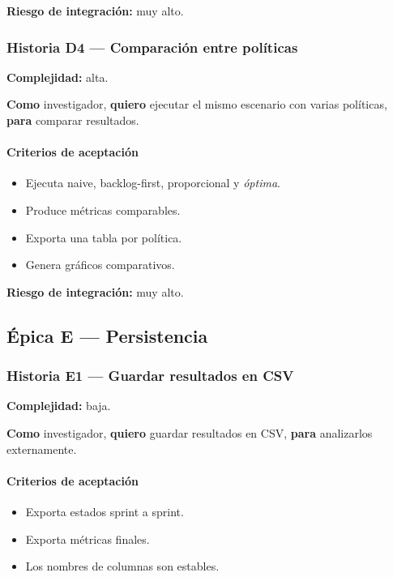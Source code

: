 \documentclass[11pt,a4paper]{article}
\begin{document}
\textbf{Riesgo de integraci\'on:} muy alto.

\subsubsection{Historia D4 --- Comparaci\'on entre pol\'iticas}

\textbf{Complejidad:} alta.

\textbf{Como} investigador, \textbf{quiero} ejecutar el mismo escenario con varias pol\'iticas, \textbf{para} comparar resultados.

\paragraph{Criterios de aceptaci\'on}

\begin{itemize}[leftmargin=*]
    \item Ejecuta naive, backlog-first, proporcional y \textit{\'optima}.
    \item Produce m\'etricas comparables.
    \item Exporta una tabla por pol\'itica.
    \item Genera gr\'aficos comparativos.
\end{itemize}

\textbf{Riesgo de integraci\'on:} muy alto.

\subsection{\'Epica E --- Persistencia}

\subsubsection{Historia E1 --- Guardar resultados en CSV}

\textbf{Complejidad:} baja.

\textbf{Como} investigador, \textbf{quiero} guardar resultados en CSV, \textbf{para} analizarlos externamente.

\paragraph{Criterios de aceptaci\'on}

\begin{itemize}[leftmargin=*]
    \item Exporta estados sprint a sprint.
    \item Exporta m\'etricas finales.
    \item Los nombres de columnas son estables.
\end{itemize}
\end{document}
